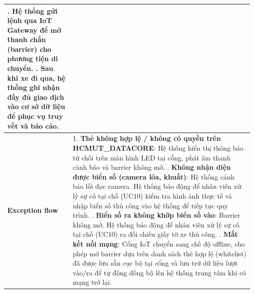 \begin{center}
\begin{longtable}{|>{\raggedright\arraybackslash}m{3.5cm}|m{12cm}|}
    6. Hệ thống gửi lệnh qua IoT Gateway để mở thanh chắn (barrier) cho phương tiện di chuyển. \newline
    7. Sau khi xe đi qua, hệ thống ghi nhận đầy đủ giao dịch vào cơ sở dữ liệu để phục vụ truy vết và báo cáo. \\
\hline
    \textbf{Exception flow} & 
    1. \textbf{Thẻ không hợp lệ / không có quyền trên HCMUT\_DATACORE}: Hệ thống hiển thị thông báo từ chối trên màn hình LED tại cổng, phát âm thanh cảnh báo và barrier không mở. \newline
    2. \textbf{Không nhận diện được biển số (camera lóa, khuất)}: Hệ thống cảnh báo lỗi đọc camera. Hệ thống báo động để nhân viên xử lý sự cố tại chỗ (UC10) kiểm tra hình ảnh thực tế và nhập biển số thủ công vào hệ thống để tiếp tục quy trình. \newline
    3. \textbf{Biển số ra không khớp biển số vào}: Barrier không mở. Hệ thống báo động để nhân viên xử lý sự cố tại chỗ (UC10) ra đối chiếu giấy tờ xe thủ công. \newline
    4. \textbf{Mất kết nối mạng}: Cổng IoT chuyển sang chế độ offline, cho phép mở barrier dựa trên danh sách thẻ hợp lệ (whitelist) đã được lưu sẵn cục bộ tại cổng và lưu trữ dữ liệu lượt vào/ra để tự động đồng bộ lên hệ thống trung tâm khi có mạng trở lại. \\
\hline
\end{longtable}
\end{center}